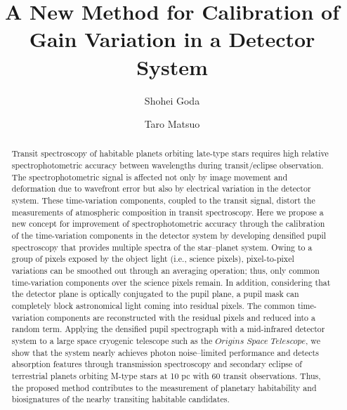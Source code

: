 \documentclass{aastex62}
\begin{document}
\title{A New Method for Calibration of Gain Variation in a Detector System}

\author{Shohei Goda}

\author{Taro Matsuo}


\begin{abstract}

Transit spectroscopy of habitable planets orbiting late-type stars requires high relative spectrophotometric accuracy between wavelengths during transit/eclipse observation. The spectrophotometric signal is affected not only by image movement and deformation due to wavefront error but also by electrical variation in the detector system. These time-variation components, coupled to the transit signal, distort the measurements of atmospheric composition in transit spectroscopy. Here we propose a new concept for improvement of spectrophotometric accuracy through the calibration of the time-variation components in the detector system by developing densified pupil spectroscopy that provides multiple spectra of the star--planet system. Owing to a group of pixels exposed by the object light (i.e., science pixels), pixel-to-pixel variations can be smoothed out through an averaging operation; thus, only common time-variation components over the science pixels remain. In addition, considering that the detector plane is optically conjugated to the pupil plane, a pupil mask can completely block astronomical light coming into residual pixels. The common time-variation components are reconstructed with the residual pixels and reduced into a random term. Applying the densified pupil spectrograph with a mid-infrared detector system to a large space cryogenic telescope such as the $Origins$ $Space$ $Telescope$, we show that the system nearly achieves photon noise--limited performance and detects absorption features through transmission spectroscopy and secondary eclipse of terrestrial planets orbiting M-type stars at 10 pc with 60 transit observations. Thus, the proposed method contributes to the measurement of planetary habitability and biosignatures of the nearby transiting habitable candidates.

\end{abstract}

\vspace{1cm}
\end{document}

